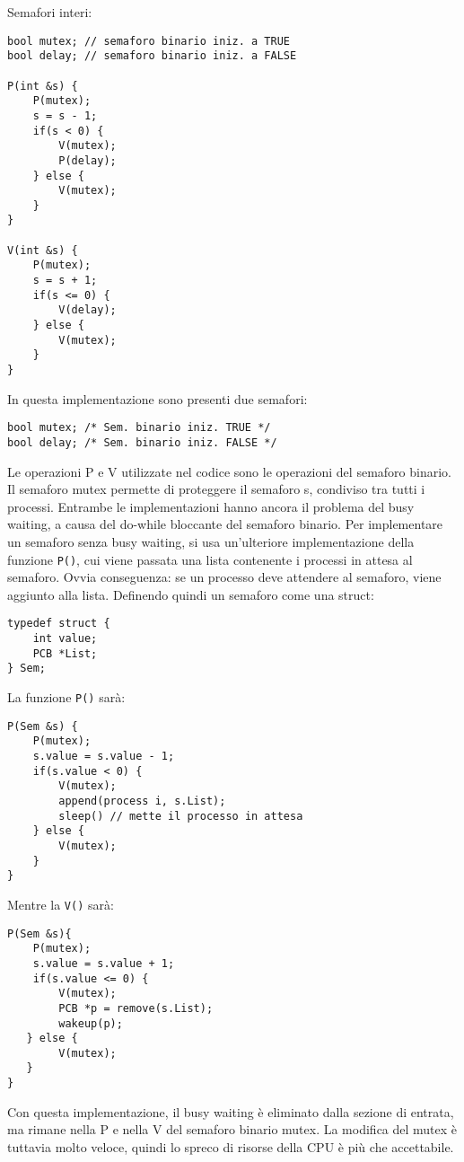 \documentclass[a4]{article}
\begin{document}
Semafori interi:
\begin{verbatim}
bool mutex; // semaforo binario iniz. a TRUE
bool delay; // semaforo binario iniz. a FALSE

P(int &s) {
    P(mutex);
    s = s - 1;
    if(s < 0) {
        V(mutex);
        P(delay);
    } else {
        V(mutex);
    }
}

V(int &s) {
    P(mutex);
    s = s + 1;
    if(s <= 0) {
        V(delay);
    } else {
        V(mutex);
    }
}
\end{verbatim}

In questa implementazione sono presenti due semafori:

\begin{verbatim}
bool mutex; /* Sem. binario iniz. TRUE */
bool delay; /* Sem. binario iniz. FALSE */
\end{verbatim}

Le operazioni P e V utilizzate nel codice sono le operazioni del semaforo binario. Il semaforo mutex permette di proteggere il semaforo s, condiviso tra tutti i processi. Entrambe le implementazioni hanno ancora il problema del busy waiting, a causa del do-while bloccante del semaforo binario.
Per implementare un semaforo senza busy waiting, si usa un'ulteriore implementazione della funzione \verb|P()|, cui viene passata una lista contenente i processi in attesa al semaforo. Ovvia conseguenza: se un processo deve attendere al semaforo, viene aggiunto alla lista. Definendo quindi un semaforo come una struct:
\begin{verbatim}
typedef struct {
    int value;
    PCB *List;
} Sem;
\end{verbatim}
La funzione \verb|P()| sarà:
\begin{verbatim}
P(Sem &s) {
    P(mutex);
    s.value = s.value - 1;
    if(s.value < 0) {
        V(mutex);
        append(process i, s.List);
        sleep() // mette il processo in attesa
    } else {
        V(mutex);
    }
}
\end{verbatim}
Mentre la \verb|V()| sarà:
\begin{verbatim}
P(Sem &s){
    P(mutex);
    s.value = s.value + 1;
    if(s.value <= 0) {
        V(mutex);
        PCB *p = remove(s.List);
        wakeup(p);
   } else {
        V(mutex);
   } 
}
\end{verbatim}

Con questa implementazione, il busy waiting è eliminato dalla sezione di entrata, ma rimane nella P e nella V del semaforo binario mutex. La modifica del mutex è tuttavia molto veloce, quindi lo spreco di risorse della CPU è più che accettabile.
\end{document}
